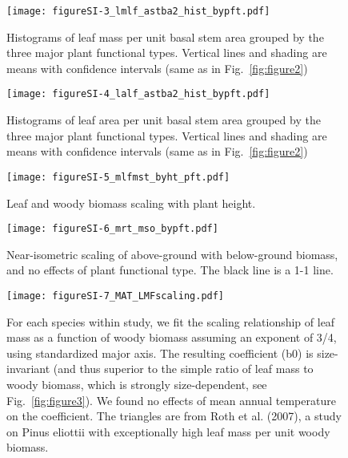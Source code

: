 \documentclass[a4paper]{article}
\begin{document}
\begin{figure}[h!]
    \centering
    \texttt{[image: figureSI-3\_lmlf\_astba2\_hist\_bypft.pdf]}
    \caption{Histograms of leaf mass per unit basal stem area grouped by the three major plant functional types. Vertical lines and shading are means with confidence intervals (same as in Fig.~\ref{fig:figure2})}
    \label{fig:figureSI3}
\end{figure}

\begin{figure}[h!]
    \centering
    \texttt{[image: figureSI-4\_lalf\_astba2\_hist\_bypft.pdf]}
    \caption{Histograms of leaf area per unit basal stem area grouped by the three major plant functional types. Vertical lines and shading are means with confidence intervals (same as in Fig.~\ref{fig:figure2})}
    \label{fig:figureSI4}
\end{figure}

\begin{figure}[h!]
    \centering
    \texttt{[image: figureSI-5\_mlfmst\_byht\_pft.pdf]}
    \caption{Leaf and woody biomass scaling with plant height.}
    \label{fig:figureSI5}
\end{figure}

\begin{figure}[h!]
    \centering
    \texttt{[image: figureSI-6\_mrt\_mso\_bypft.pdf]}
    \caption{Near-isometric scaling of above-ground with below-ground biomass, and no effects of plant functional type. The black line is a 1-1 line.}
    \label{fig:figureSI6}
\end{figure}

\begin{figure}[h!]
    \centering
    \texttt{[image: figureSI-7\_MAT\_LMFscaling.pdf]}
    \caption{For each species within study, we fit the scaling relationship of leaf mass as a function of woody biomass assuming an exponent of 3/4, using standardized major axis. The resulting coefficient (b0) is size-invariant (and thus superior to the simple ratio of leaf mass to woody biomass, which is strongly size-dependent, see Fig.~\ref{fig:figure3}). We found no effects of mean annual temperature on the coefficient. The triangles are from Roth et al. (2007), a study on Pinus eliottii with exceptionally high leaf mass per unit woody biomass.}
    \label{fig:figureSI7}
\end{figure}




\clearpage

\end{document}
